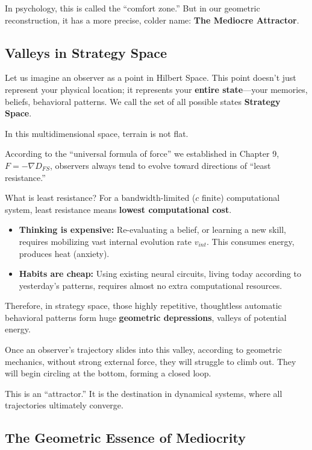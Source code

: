 \documentclass[11pt,a4paper,twoside]{book}
\begin{document}
In psychology, this is called the ``comfort zone.'' But in our geometric reconstruction, it has a more precise, colder name: \textbf{The Mediocre Attractor}.

\subsection{Valleys in Strategy Space}

Let us imagine an observer as a point in Hilbert Space. This point doesn't just represent your physical location; it represents your \textbf{entire state}---your memories, beliefs, behavioral patterns. We call the set of all possible states \textbf{Strategy Space}.

In this multidimensional space, terrain is not flat.

According to the ``universal formula of force'' we established in Chapter 9, $F = -\nabla D_{FS}$, observers always tend to evolve toward directions of ``least resistance.''

What is least resistance? For a bandwidth-limited ($c$ finite) computational system, least resistance means \textbf{lowest computational cost}.

\begin{itemize}
\item \textbf{Thinking is expensive:} Re-evaluating a belief, or learning a new skill, requires mobilizing vast internal evolution rate $v_{int}$. This consumes energy, produces heat (anxiety).

\item \textbf{Habits are cheap:} Using existing neural circuits, living today according to yesterday's patterns, requires almost no extra computational resources.
\end{itemize}

Therefore, in strategy space, those highly repetitive, thoughtless automatic behavioral patterns form huge \textbf{geometric depressions}, valleys of potential energy.

Once an observer's trajectory slides into this valley, according to geometric mechanics, without strong external force, they will struggle to climb out. They will begin circling at the bottom, forming a closed loop.

This is an ``attractor.'' It is the destination in dynamical systems, where all trajectories ultimately converge.

\subsection{The Geometric Essence of Mediocrity}
\end{document}
